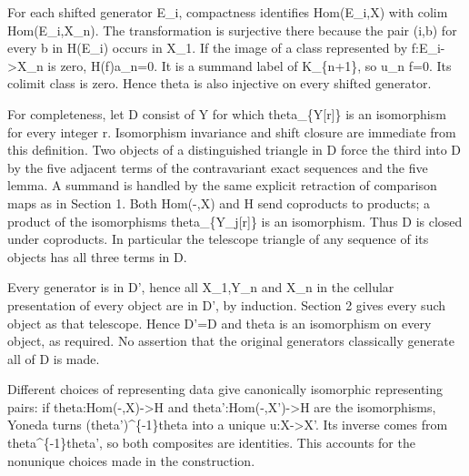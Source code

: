 For each shifted generator E\_\allowbreak{}i,\allowbreak{} compactness identifies Hom(E\_\allowbreak{}i,\allowbreak{}X)\allowbreak{} with colim Hom(E\_\allowbreak{}i,\allowbreak{}X\_\allowbreak{}n)\allowbreak{}. The transformation is surjective there because the pair (i,\allowbreak{}b)\allowbreak{} for every b in H(E\_\allowbreak{}i)\allowbreak{} occurs in X\_\allowbreak{}1. If the image of a class represented by f:\allowbreak{}E\_\allowbreak{}i\allowbreak{}->X\_\allowbreak{}n is zero,\allowbreak{} H(f)\allowbreak{}a\_\allowbreak{}n\allowbreak{}=0. It is a summand label of K\_\allowbreak{}\{n\allowbreak{}+1\},\allowbreak{} so u\_\allowbreak{}n f\allowbreak{}=0. Its colimit class is zero. Hence theta is also injective on every shifted generator.

For completeness,\allowbreak{} let D\textquotesingle{} consist of Y for which theta\_\allowbreak{}\{Y[r]\allowbreak{}\} is an isomorphism for every integer r. Isomorphism invariance and shift closure are immediate from this definition. Two objects of a distinguished triangle in D\textquotesingle{} force the third into D\textquotesingle{} by the five adjacent terms of the contravariant exact sequences and the five lemma. A summand is handled by the same explicit retraction of comparison maps as in Section 1. Both Hom(-,\allowbreak{}X)\allowbreak{} and H send coproducts to products; a product of the isomorphisms theta\_\allowbreak{}\{Y\_\allowbreak{}j[r]\allowbreak{}\} is an isomorphism. Thus D\textquotesingle{} is closed under coproducts. In particular the telescope triangle of any sequence of its objects has all three terms in D\textquotesingle.

Every generator is in D',\allowbreak{} hence all X\_\allowbreak{}1,\allowbreak{}Y\_\allowbreak{}n and X\_\allowbreak{}n in the cellular presentation of every object are in D',\allowbreak{} by induction. Section 2 gives every such object as that telescope. Hence D'\allowbreak{}=D and theta is an isomorphism on every object,\allowbreak{} as required. No assertion that the original generators classically generate all of D is made.

Different choices of representing data give canonically isomorphic representing pairs:\allowbreak{} if theta:\allowbreak{}Hom(-,\allowbreak{}X)\allowbreak{}\allowbreak{}->H and theta':\allowbreak{}Hom(-,\allowbreak{}X')\allowbreak{}\allowbreak{}->H are the isomorphisms,\allowbreak{} Yoneda turns (theta')\allowbreak{}\textasciicircum{}\{-1\}theta into a unique u:\allowbreak{}X\allowbreak{}->X'. Its inverse comes from theta\textasciicircum{}\{-1\}theta',\allowbreak{} so both composites are identities. This accounts for the nonunique choices made in the construction.

